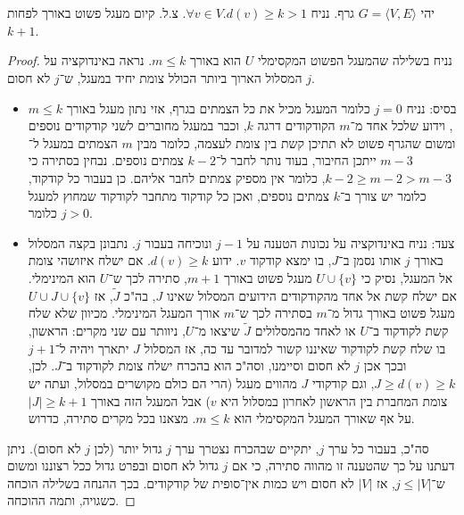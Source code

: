 \documentclass[]{article}
\newcommand\ra    {\rangle}
\newcommand\la    {\langle}
\newcommand\tl    {\tilde}
\begin{document}
	\section{}
	יהי $G = \la V, E \ra$ גרף. נניח $\forall v \in V. d(v) \ge k >1$. צ.ל. קיום מעגל פשוט באורך לפחות $k + 1$. 
	\begin{proof}
		נניח בשלילה שהמעגל הפשוט המקסימלי $U$ הוא באורך $m \le k$. נראה באינדוקציה על $j$ המסלול הארוך ביותר הכולל צומת יחיד במעגל, ש־$j$ לא חסום.
		\begin{itemize}
			\item בסיס: נניח $j = 0$ כלומר המעגל מכיל את כל הצמתים בגרף, אזי נתון מעגל באורך $m \le k$, וידוע שלכל אחד מ־$m$ הקודקודים דרגה $k$, וכבר במעגל מחוברים לשני קודקודים נוספים ומשום שהגרף פשוט לא תתיכן קשת בין צומת לעצמה, כלומר מבין $m$ הצמתים במעגל ל־$m - 3$ ייתכן החיבור, בעוד נותר לחבר ל־$k - 2$ צמתים נוספים. נבחין בסתירה כי $k - 2 \ge m - 2 > m - 3$, כלומר אין מספיק צמתים לחבר אליהם. כן בעבור כל קודקוד, כלומר יש צורך ב־$k$ צמתים נוספים, ואכן כל קודקוד מתחבר לקודקוד שמחוץ למעגל כלומר $j > 0$. 
			\item צעד: נניח באינדוקציה על נכונות הטענה על $j - 1$ ונוכיחה בעבור $j$. נתבונן בקצה המסלול באורך $j$ אותו נסמן ב־$J$, בו ימצא קודקוד $v$. ידוע $d(v) \ge k$. אם ישלח איזושהי צומת אל המעגל, נסיק כי $U \cup \{v\}$ מעגל פשוט באורך $m + 1$, סתירה לכך ש־$U$ הוא המינימלי. אם ישלח קשת אל אחד מהקודקודים הידועים המסלול שאינו $J$, בה"כ $\tl J$, אז $U \cup J \cup \{v\}$ מעגל פשוט באורך גדול מ־$m$ בסתירה לכך ש־$m$ אורך המעגל המינימלי. מכיוון שלא שלח קשת לקודקוד ב־$U$ או לאחד מהמסלולים $\tl J$ שיצאו מ־$U$, ניוותר עם שני מקרים: הראשון, בו שלח קשת לקודקוד שאיננו קשור למדובר עד כה, אז המסלול $J$ יתארך ויהיה ל־$j + 1$ ובכך אכן $j$ לא חסום וסיימנו, וסה"כ הוא בהכרח ישלח צומת לקודקוד ב־$J$. לכן, $J \ge d(v) \ge k$, וגם קודקודי $J$ מהווים מעגל (הרי הם כולם מקושרים במסלול, ועתה יש צומת המחברת בין הראשון לאחרון במסלול היא $v$) אבל המעגל הזה באורך $|J| \ge k + 1$ על אף שאורך המעגל המקסימלי הוא $m \le k$. מצאנו בכל מקרים סתירה, כדרוש. 
		\end{itemize}
		סה"כ, בעבור כל ערך $j$, יתקיים שבהכרח נצטרך ערך $j$ גדול יותר (לכן $j$ לא חסום). ניתן דעתנו על כך שהטענה זו מהווה סתירה, כי אם $j$ גדול לא חסום ובפרט גדול ככל רצוננו ומשום ש־$j \le |V|$, אז  $|V|$ לא חסום ויש כמות אין־סופית של קודקודים. בכך ההנחה בשלילה הוכחה כשגויה, ותמה ההוכחה. 
	\end{proof}
\end{document}
